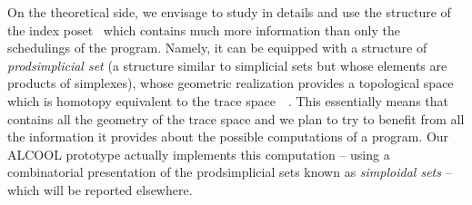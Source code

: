 \documentclass[orivec]{llncs} \usepackage[T1]{fontenc}
\begin{document}
On the theoretical side, we envisage to study in details and use the structure
of the index poset~ which contains much more information than only the
schedulings of the program. Namely, it can be equipped with a structure of
\emph{prodsimplicial set} \cite{kozlov} (a structure similar to simplicial sets
but whose elements are products of simplexes), whose geometric realization
provides a topological space which is homotopy equivalent to the trace
space~~\cite{raussen2010simplicial}. This essentially means
that~ contains all the geometry of the trace space and we plan to try to
benefit from all the information it provides about the possible computations of
a program. Our ALCOOL prototype actually implements this computation -- using a
combinatorial presentation of the prodsimplicial sets known as \emph{simploidal
  sets} \cite{simploidal} -- which will be reported elsewhere.


















\end{document}
